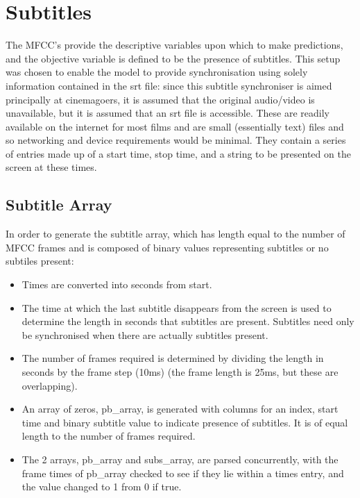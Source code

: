 \section{Subtitles}
The MFCC’s provide the descriptive variables upon which to make predictions, and the objective variable is defined to be the presence of subtitles. This setup was chosen to enable the model to provide synchronisation using solely information contained in the srt file: since this subtitle synchroniser is aimed principally at cinemagoers, it is assumed that the original audio/video is unavailable, but it is assumed that an srt file is accessible. These are readily available on the internet for most films and are small (essentially text) files and so networking and device requirements would be minimal. They contain a series of entries made up of a start time, stop time, and a string to be presented on the screen at these times. 

\subsection{Subtitle Array}
In order to generate the subtitle array, which has length equal to the number of MFCC frames and is composed of binary values representing subtitles or no subtiles present:
\begin{itemize}
	\item Times are converted into seconds from start.
	\item The time at which the last subtitle disappears from the screen is used to determine the length in seconds that subtitles are present. Subtitles need only be synchronised when there are actually subtitles present.
	\item The number of frames required is determined by dividing the length in seconds by the frame step (10ms) (the frame length is 25ms, but these are overlapping).
	\item An array of zeros, pb\_array, is generated with columns for an index, start time and binary subtitle value to indicate presence of subtitles. It is of equal length to the number of frames required.
	\item The 2 arrays, pb\_array and subs\_array, are parsed concurrently, with the frame times of pb\_array checked to see if they lie within a times entry, and the value changed to 1 from 0 if true.
\end{itemize}
\newpage
